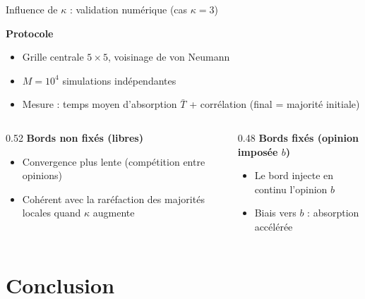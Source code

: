 \documentclass{beamer}
\begin{document}
\begin{frame}{Influence de $\kappa$ : validation numérique (cas $\kappa=3$)}

\small

\textbf{Protocole}
\begin{itemize}
  \item Grille centrale $5\times 5$, voisinage de von Neumann
  \item $M=10^4$ simulations indépendantes
  \item Mesure : temps moyen d’absorption $\bar T$ + corrélation (final = majorité initiale)
\end{itemize}

\medskip

\begin{columns}
\begin{column}{0.52\textwidth}
\textbf{Bords non fixés (libres)}

\medskip
\begin{itemize}
  \item Convergence plus lente (compétition entre opinions)
  \item Cohérent avec la raréfaction des majorités locales quand $\kappa$ augmente
\end{itemize}
\end{column}

\begin{column}{0.48\textwidth}
\textbf{Bords fixés (opinion imposée $b$)}

\medskip
\begin{itemize}
  \item Le bord injecte en continu l’opinion $b$
  \item Biais vers $b$ : absorption accélérée
\end{itemize}
\end{column}
\end{columns}

\end{frame}



\section{Conclusion}
\end{document}
